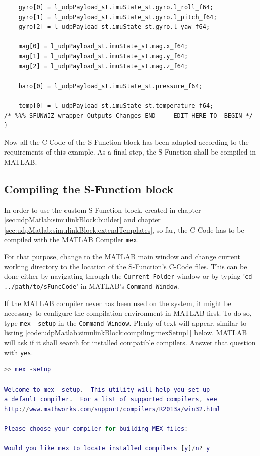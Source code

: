 \begin{lstlisting}
    gyro[0] = l_udpPayload_st.imuState_st.gyro.l_roll_f64;
    gyro[1] = l_udpPayload_st.imuState_st.gyro.l_pitch_f64;
    gyro[2] = l_udpPayload_st.imuState_st.gyro.l_yaw_f64;
    
    mag[0] = l_udpPayload_st.imuState_st.mag.x_f64;
    mag[1] = l_udpPayload_st.imuState_st.mag.y_f64;
    mag[2] = l_udpPayload_st.imuState_st.mag.z_f64;
    
    baro[0] = l_udpPayload_st.imuState_st.pressure_f64;
    
    temp[0] = l_udpPayload_st.imuState_st.temperature_f64;
/* %%%-SFUNWIZ_wrapper_Outputs_Changes_END --- EDIT HERE TO _BEGIN */
}
\end{lstlisting}

Now all the C-Code of the S-Function block has been adapted according to the requirements of this example. As a final step, the S-Function shall be compiled in MATLAB.

\subsection{Compiling the S-Function block}
\label{sec:udpMatlab:simulinkBlock:compiling}

In order to use the custom S-Function block, created in chapter \ref{sec:udpMatlab:simulinkBlock:builder} and chapter \ref{sec:udpMatlab:simulinkBlock:extendTemplates}, so far, the C-Code has to be compiled with the MATLAB Compiler \texttt{mex}.

For that purpose, change to the MATLAB main window and change current working directory to the location of the S-Function's C-Code files. This can be done either by navigating through the \texttt{Current Folder} window or by typing '\texttt{cd ../path/to/sFuncCode}' in MATLAB's \texttt{Command Window}.

If the MATLAB compiler never has been used on the system, it might be necessary to configure the compilation environment in MATLAB first. To do so, type \texttt{mex -setup} in the \texttt{Command Window}. Plenty of text will appear, similar to listing \ref{code:udpMatlab:simulinkBlock:compiling:mexSetup1} below. MATLAB will ask if it shall search for installed compatible compilers. Answer that question with \texttt{yes}.

\begin{lstlisting}[language=MATLAB,caption=Configuration of MATLAB's mex compiler (part 1),label=code:udpMatlab:simulinkBlock:compiling:mexSetup1]
>> mex -setup
 
Welcome to mex -setup.  This utility will help you set up  
a default compiler.  For a list of supported compilers, see  
http://www.mathworks.com/support/compilers/R2013a/win32.html 
 
Please choose your compiler for building MEX-files: 
 
Would you like mex to locate installed compilers [y]/n? y
\end{lstlisting}

